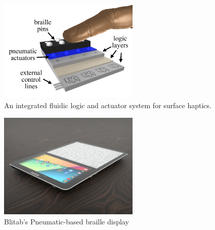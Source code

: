 \begin{figure}\centering
    \includegraphics[width=0.6\textwidth]{figures/fluidic logic system.png}
\caption{An integrated fluidic logic and actuator system for surface haptics.}
\label{fig:Integrated fluidic logic system}
\end{figure}

\begin{figure}\centering
    \includegraphics[width=0.6\textwidth]{figures/Blitab_product.jpg}
\caption{Blitab's Pneumatic-based braille display}
\label{fig:Blitab-product}
\end{figure}